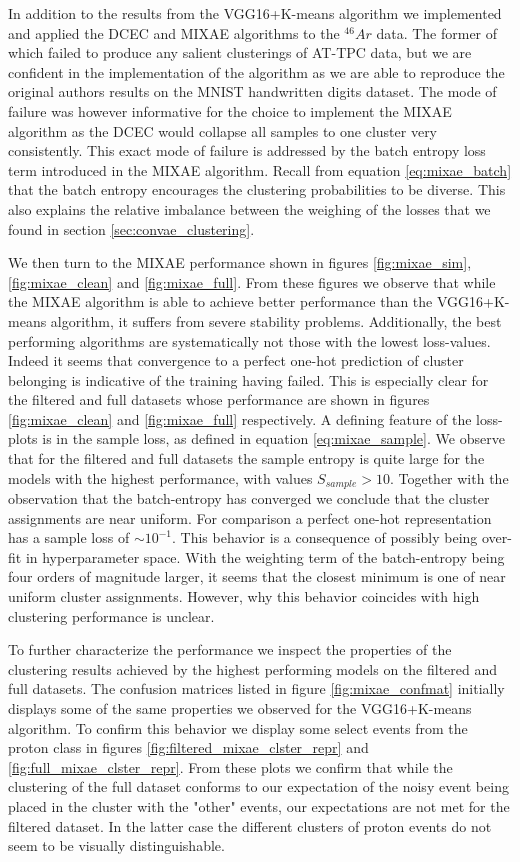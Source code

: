 In addition to the results from the VGG16+K-means algorithm we implemented and applied the DCEC and MIXAE algorithms to the ${}^{46}Ar$ data. The former of which failed to produce any salient clusterings of AT-TPC data, but we are confident in the implementation of the algorithm as we are able to reproduce the original authors results on the MNIST handwritten digits dataset. The mode of failure was however informative for the choice to implement the MIXAE algorithm as the DCEC would collapse all samples to one cluster very consistently. This exact mode of failure is addressed by the batch entropy loss term introduced in the MIXAE algorithm. Recall from equation \ref{eq:mixae_batch} that the batch entropy encourages the clustering probabilities to be diverse. This also explains the relative imbalance between the weighing of the losses that we found in section \ref{sec:convae_clustering}.

We then turn to the MIXAE performance shown in figures \ref{fig:mixae_sim}, \ref{fig:mixae_clean} and \ref{fig:mixae_full}. From these figures we observe that while the MIXAE algorithm is able to achieve better performance than the VGG16+K-means algorithm, it suffers from severe stability problems. Additionally, the best performing algorithms are systematically not those with the lowest loss-values. Indeed it seems that convergence to a perfect one-hot prediction of cluster belonging is indicative of the training having failed. This is especially clear for the filtered and full datasets whose performance are shown in figures \ref{fig:mixae_clean} and \ref{fig:mixae_full} respectively. A defining feature of the loss-plots is in the sample loss, as defined in equation \ref{eq:mixae_sample}. We observe that for the filtered and full datasets the sample entropy is quite large for the models with the highest performance, with values $S_{sample} > 10$. Together with the observation that the batch-entropy has converged we conclude that the cluster assignments are near uniform. For comparison a perfect one-hot representation has a sample loss of $\sim 10^{-1}$. This behavior is a consequence of possibly being over-fit in hyperparameter space. With the weighting term of the batch-entropy being four orders of magnitude larger, it seems that the closest minimum is one of near uniform cluster assignments. However, why this behavior coincides with high clustering performance is unclear.

To further characterize the performance we inspect the properties of the clustering results achieved by the highest performing models on the filtered and full datasets. The confusion matrices listed in figure \ref{fig:mixae_confmat} initially displays some of the same properties we observed for the VGG16+K-means algorithm. To confirm this behavior we display some select events from the proton class in figures \ref{fig:filtered_mixae_clster_repr} and \ref{fig:full_mixae_clster_repr}. From these plots we confirm that while the clustering of the full dataset conforms to our expectation of the noisy event being placed in the cluster with the "other" events, our expectations are not met for the filtered dataset. In the latter case the different clusters of proton events do not seem to be visually distinguishable.

